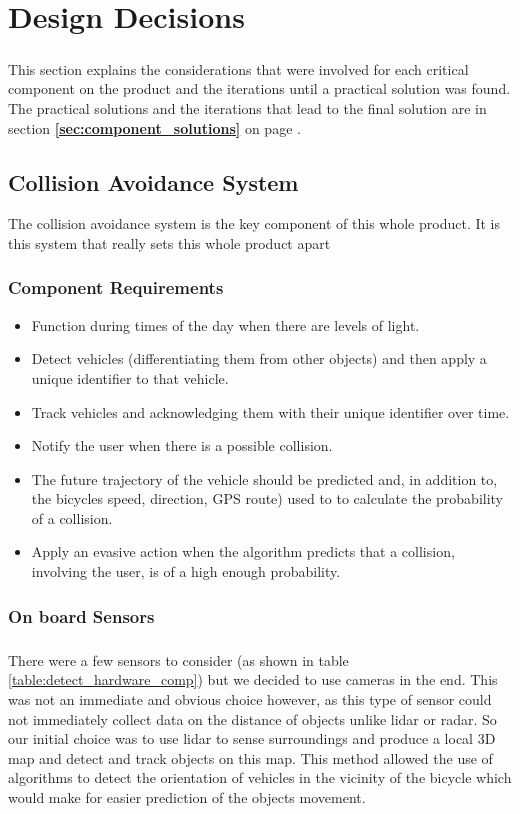\documentclass[a4paper]{report}
\begin{document}
\chapter{Design Decisions}

\paragraph{}This section explains the considerations that were involved for each critical component on the product and the iterations until a practical solution was found. The practical solutions and the iterations that lead to the final solution are in section \textbf{\ref{sec:component_solutions} } on page \textbf{\pageref{sec:component_solutions}}. 

\section{Collision Avoidance System}
The collision avoidance system is the key component of this whole product. It is this system that really sets this whole product apart
\subsection{Component Requirements}
\begin{itemize}
  \item Function during times of the day when there are levels of light.
  \item Detect vehicles (differentiating them from other objects) and then apply a unique identifier to that vehicle.
  \item Track vehicles and acknowledging them with their unique identifier over time.
  \item Notify the user when there is a possible collision.
  \item The future trajectory of the vehicle should be predicted and, in addition to, the bicycles speed, direction, GPS route) used to to calculate the probability of a collision.
  \item Apply an evasive action when the algorithm predicts that a collision, involving the user, is of a high enough probability. 
\end{itemize}

\subsection{On board Sensors}
\paragraph{} There were a few sensors to consider (as shown in table \ref{table:detect_hardware_comp}) but we decided to use cameras in the end. This was not an immediate and obvious choice however, as this type of sensor could not immediately collect data on the distance of objects unlike lidar or radar. So our initial choice was to use lidar to sense surroundings and produce a local 3D map and detect and track objects on this map. This method allowed the use of algorithms to detect the orientation of vehicles in the vicinity of the bicycle which would make for easier prediction of the objects movement.
\end{document}
